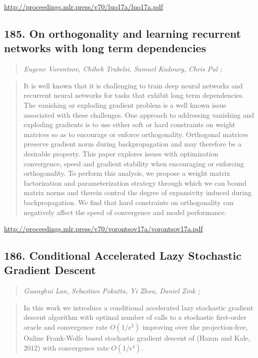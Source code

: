 \documentclass{article}
\begin{document}
\href{http://proceedings.mlr.press/v70/luo17a/luo17a.pdf}{http://proceedings.mlr.press/v70/luo17a/luo17a.pdf}

\subsection{185. On orthogonality and learning recurrent networks with long term dependencies}

\begin{quote}
\footnotesize{\textit{Eugene Vorontsov, Chiheb Trabelsi, Samuel Kadoury, Chris Pal ;}}
\end{quote}

\begin{quote}
    It is well known that it is challenging to train deep neural networks and recurrent neural networks for tasks that exhibit long term dependencies. The vanishing or exploding gradient problem is a well known issue associated with these challenges. One approach to addressing vanishing and exploding gradients is to use either soft or hard constraints on weight matrices so as to encourage or enforce orthogonality. Orthogonal matrices preserve gradient norm during backpropagation and may therefore be a desirable property. This paper explores issues with optimization convergence, speed and gradient stability when encouraging or enforcing orthogonality. To perform this analysis, we propose a weight matrix factorization and parameterization strategy through which we can bound matrix norms and therein control the degree of expansivity induced during backpropagation. We find that hard constraints on orthogonality can negatively affect the speed of convergence and model performance.  \end{quote}

\href{http://proceedings.mlr.press/v70/vorontsov17a/vorontsov17a.pdf}{http://proceedings.mlr.press/v70/vorontsov17a/vorontsov17a.pdf}

\subsection{186. Conditional Accelerated Lazy Stochastic Gradient Descent}

\begin{quote}
\footnotesize{\textit{Guanghui Lan, Sebastian Pokutta, Yi Zhou, Daniel Zink ;}}
\end{quote}

\begin{quote}
    In this work we introduce a conditional accelerated lazy stochastic gradient descent algorithm with optimal number of calls to a stochastic first-order oracle and convergence rate $O(1/\epsilon^2)$ improving over the projection-free, Online Frank-Wolfe based stochastic gradient descent of (Hazan and Kale, 2012) with convergence rate $O(1/\epsilon^4)$.  \end{quote}
\end{document}
